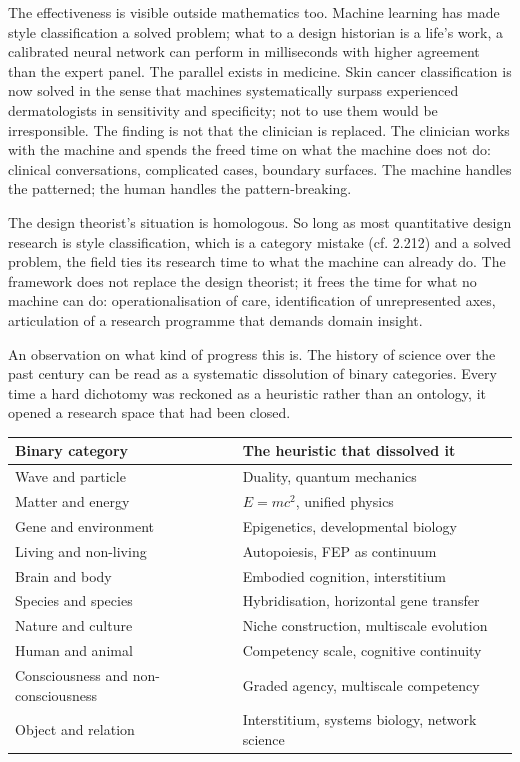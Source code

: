 \begin{widebody}
{The effectiveness is visible outside mathematics too. Machine learning has made style classification a solved problem; what to a design historian is a life's work, a calibrated neural network can perform in milliseconds with higher agreement than the expert panel. The parallel exists in medicine. Skin cancer classification is now solved in the sense that machines systematically surpass experienced dermatologists in sensitivity and specificity; not to use them would be irresponsible. The finding is not that the clinician is replaced. The clinician works with the machine and spends the freed time on what the machine does not do: clinical conversations, complicated cases, boundary surfaces. The machine handles the patterned; the human handles the pattern-breaking.

The design theorist's situation is homologous. So long as most quantitative design research is style classification, which is a category mistake (cf. 2.212) and a solved problem, the field ties its research time to what the machine can already do. The framework does not replace the design theorist; it frees the time for what no machine can do: operationalisation of care, identification of unrepresented axes, articulation of a research programme that demands domain insight.

An observation on what kind of progress this is. The history of science over the past century can be read as a systematic dissolution of binary categories. Every time a hard dichotomy was reckoned as a heuristic rather than an ontology, it opened a research space that had been closed.

\begin{center}
\footnotesize
\setlength{\tabcolsep}{5pt}
\renewcommand{\arraystretch}{1.4}
\begin{tabular}{@{}p{42mm}p{56mm}@{}}
\toprule
\textbf{Binary category} & \textbf{The heuristic that dissolved it} \\
\midrule
Wave and particle & Duality, quantum mechanics \\
Matter and energy & $E=mc^2$, unified physics \\
Gene and environment & Epigenetics, developmental biology \\
Living and non-living & Autopoiesis, FEP as continuum \\
Brain and body & Embodied cognition, interstitium \\
Species and species & Hybridisation, horizontal gene transfer \\
Nature and culture & Niche construction, multiscale evolution \\
Human and animal & Competency scale, cognitive continuity \\
Consciousness and non-consciousness & Graded agency, multiscale competency \\
Object and relation & Interstitium, systems biology, network science \\
\bottomrule
\end{tabular}
\end{center}

}
\end{widebody}
